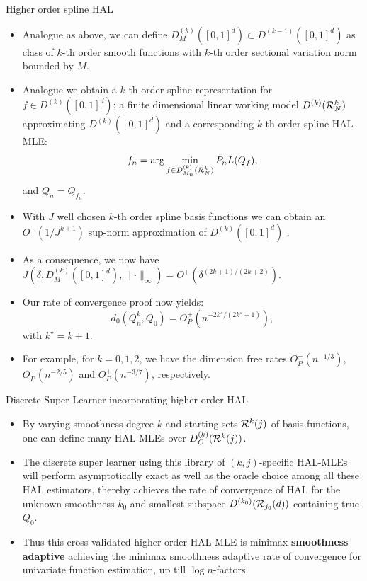 \documentclass[t]{beamer}
\begin{document}
\begin{frame}{Higher order spline HAL}
\begin{itemize}
\item Analogue as above, we can define $D^{(k)}_M([0,1]^d)\subset D^{(k-1)}([0,1]^d)$ as class of $k$-th order smooth functions with $k$-th order sectional variation norm bounded by $M$.
\item Analogue we obtain a $k$-th order spline representation for $f\in D^{(k)}([0,1]^d)$; a finite dimensional linear working model $D^{(k)}({\cal R}^k_N)$ approximating $D^{(k)}([0,1]^d)$ and a corresponding $k$-th order spline HAL-MLE:
\[
f_n=\arg\min_{f\in D^{(k)}_{M_n}({\cal R}^k_N)}P_n L(Q_f),\]
and $Q_n=Q_{f_n}$.
\item With $J$ well chosen $k$-th order spline basis functions we can obtain an $O^+(1/J^{k+1})$ sup-norm approximation of $D^{(k)}([0,1]^d)$ .
\end{itemize}
\end{frame}
\begin{frame}
\begin{itemize}
\item As a consequence, we now have
$J(\delta,D^{(k)}_M([0,1]^d),\lVert\cdot\rVert_{\infty})=O^+(\delta^{(2k+1)/(2k+2)})$.
\item Our rate of convergence proof now yields:
\[
d_0(Q_n^k,Q_0)=O^+_P(n^{-2k^{\star}/(2k^{\star}+1)}),\]
with $k^{\star}=k+1$.
\item For example, for $k=0,1,2$, we have the dimension free rates $O_P^+(n^{-1/3})$, $O_P^+(n^{-2/5})$ and $O_P^+(n^{-3/7})$, respectively.
\end{itemize}
\end{frame}
\begin{frame}{Discrete Super Learner incorporating  higher order HAL}
\begin{itemize}
    \item By varying smoothness degree $k$ and starting sets ${\cal R}^k(j)$ of basis functions, one can define many HAL-MLEs over  $D^{(k)}_C({\cal R}^k(j))$.
    \item The discrete super learner using this library of $(k,j)$-specific HAL-MLEs will perform asymptotically exact as well as the oracle choice among all these HAL estimators,  thereby achieves the rate of convergence of HAL for the unknown smoothness $k_0$  and smallest subspace $D^{(k_0)}({\cal R}_{j_0}(d))$ containing true $Q_0$.
    \item Thus this cross-validated higher order HAL-MLE is minimax {\bf smoothness adaptive} achieving the minimax smoothness adaptive rate of convergence for univariate function estimation, up till $\log n$-factors.
\end{itemize}
\end{frame}
\end{document}
